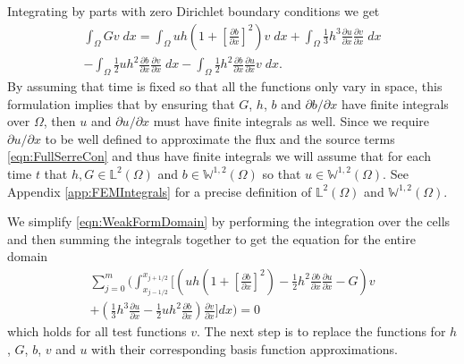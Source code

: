 \documentclass[times]{elsarticle}
\begin{document}
Integrating by parts with zero Dirichlet boundary conditions we get
\begin{multline}
\int_{\Omega } G v \; dx = \int_{\Omega } uh \left(1 + \left[\frac{\partial b}{\partial x}\right]^2 \right) v \; dx +  \int_{\Omega } \frac{1}{3}h^3  \frac{\partial {u}}{\partial x} \frac{\partial v}{\partial x} \; dx  \\ - 
\int_{\Omega }   \frac{1}{2} u h^2\frac{\partial b}{\partial x}  \frac{\partial v }{\partial x}\; dx - 
\int_{\Omega }   \frac{1}{2}h^2\frac{\partial b}{\partial x}  \frac{\partial u }{\partial x}v \; dx.
\label{eqn:WeakFormDomain}
\end{multline}
By assuming that time is fixed so that all the functions only vary in space, this formulation implies that by ensuring that $G$, $h$, $b$ and $\partial b / \partial x$ have finite integrals over $\Omega$, then $u$ and $\partial u / \partial x$ must have finite integrals as well. Since we require $\partial u / \partial x$ to be well defined to approximate the flux and the source terms \eqref{eqn:FullSerreCon} and thus have finite integrals we will assume that for each time $t$ that $h,G \in \mathbb{L}^2(\Omega)$ and $b \in\mathbb{W}^{1,2}(\Omega)$ so that $u \in \mathbb{W}^{1,2}(\Omega)$. See Appendix \ref{app:FEMIntegrals} for a precise definition of $\mathbb{L}^2(\Omega)$ and $\mathbb{W}^{1,2}(\Omega)$.

We simplify \eqref{eqn:WeakFormDomain} by performing the integration over the cells and then summing the integrals together to get the equation for the entire domain
\begin{multline}
\label{eq:elementwiseint}
\sum_{j=0}^m \Bigg(  \int_{x_{j-1/2} }^{{x_{j+1/2}}} \Bigg[  \left( uh \left(1 + \left[\frac{\partial b}{\partial x}\right]^2 \right)  - \frac{1}{2}h^2\frac{\partial b}{\partial x}  \frac{\partial u }{\partial x}  -  G \right) v   \\ +  \left(\frac{1}{3}h^3  \frac{\partial {u}}{\partial x}    -     \frac{1}{2} uh^2\frac{\partial b}{\partial x}    \right) \frac{\partial v }{\partial x} \Bigg]dx \Bigg)  = 0
\end{multline}
which holds for all test functions $v$. The next step is to replace the functions for $h$, $G$, $b$, $v$ and $u$ with their corresponding basis function approximations.
\end{document}
